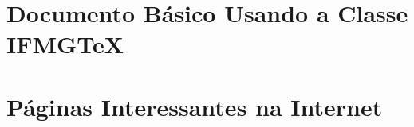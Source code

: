 \documentclass[oneside,english,brazil]{ifmgtex}
\begin{document}


\apendices\partapendices

\chapter{Documento Básico Usando a Classe {IFMG\TeX}}



\anexos\partanexos

\chapter{Páginas Interessantes na Internet} \label{capitulo:paginas_interessantes}


\end{document}
